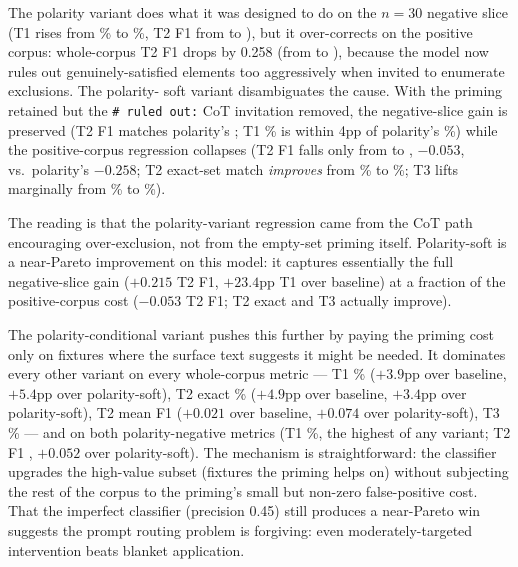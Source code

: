The polarity variant does what it was designed to do on the
$n=30$ negative slice (T1 rises from
\statBenchmarkLlmNegPolarTone{}\% to
\statBenchmarkLlmPolNegPolarTone{}\%, T2 F1 from
\statBenchmarkLlmNegPolarFOne{} to
\statBenchmarkLlmPolNegPolarFOne{}), but it over-corrects on the
positive corpus: whole-corpus T2 F1 drops by 0.258 (from
\statBenchmarkLlmTtwoFOne{} to \statBenchmarkLlmPolTtwoFOne{}),
because the model now rules out genuinely-satisfied elements too
aggressively when invited to enumerate exclusions. The polarity-
soft variant disambiguates the cause. With the priming retained
but the \texttt{\# ruled out:} CoT invitation removed, the
negative-slice gain is preserved
(T2 F1 \statBenchmarkLlmSoftNegPolarFOne{} matches polarity's
\statBenchmarkLlmPolNegPolarFOne{}; T1
\statBenchmarkLlmSoftNegPolarTone{}\% is within 4pp of polarity's
\statBenchmarkLlmPolNegPolarTone{}\%) while the positive-corpus
regression collapses (T2 F1 falls only from
\statBenchmarkLlmTtwoFOne{} to \statBenchmarkLlmSoftTtwoFOne{},
$-0.053$, vs.\ polarity's $-0.258$; T2 exact-set match
\emph{improves} from \statBenchmarkLlmTtwo{}\% to
\statBenchmarkLlmSoftTtwo{}\%; T3 lifts marginally from
\statBenchmarkLlmTthree{}\% to \statBenchmarkLlmSoftTthree{}\%).

The reading is that the polarity-variant regression came from the
CoT path encouraging over-exclusion, not from the empty-set
priming itself. Polarity-soft is a near-Pareto improvement on
this model: it captures essentially the full negative-slice gain
($+0.215$ T2 F1, $+23.4$pp T1 over baseline) at a fraction of the
positive-corpus cost ($-0.053$ T2 F1; T2 exact and T3 actually
improve).

The polarity-conditional variant pushes this further by paying
the priming cost only on fixtures where the surface text suggests
it might be needed. It dominates every other variant on every
whole-corpus metric --- T1 \statBenchmarkLlmCondTone{}\%
($+3.9$pp over baseline, $+5.4$pp over polarity-soft), T2 exact
\statBenchmarkLlmCondTtwo{}\% ($+4.9$pp over baseline,
$+3.4$pp over polarity-soft), T2 mean F1
\statBenchmarkLlmCondTtwoFOne{} ($+0.021$ over baseline,
$+0.074$ over polarity-soft), T3 \statBenchmarkLlmCondTthree{}\%
--- and on both polarity-negative metrics
(T1 \statBenchmarkLlmCondNegPolarTone{}\%, the highest of any
variant; T2 F1 \statBenchmarkLlmCondNegPolarFOne{}, $+0.052$
over polarity-soft). The mechanism is straightforward: the
classifier upgrades the high-value subset (fixtures the priming
helps on) without subjecting the rest of the corpus to the
priming's small but non-zero false-positive cost. That the
imperfect classifier (precision 0.45) still produces a
near-Pareto win suggests the prompt routing problem is forgiving:
even moderately-targeted intervention beats blanket application.

